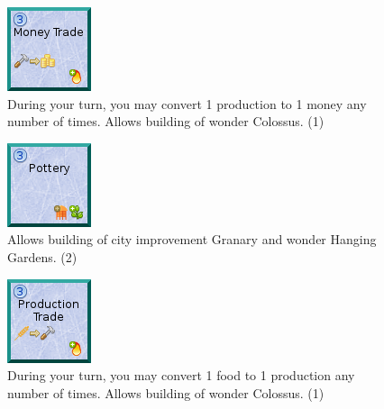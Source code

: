 \documentclass[11pt,a4paper,titlepage]{article}
\begin{document}
{{  \begin{figure}[!htb]
    \begin{minipage}[c]{0.1\textwidth}
      \includegraphics[scale=.7]{doe_tech_money_trade.png}
    \end{minipage}\hfill
    \begin{minipage}[c]{0.6\textwidth}
      \captionsetup{labelformat=empty, justification=justified, singlelinecheck=false}
      \caption{During your turn, you may convert 1 production to 1 money any number of times. Allows building of wonder Colossus. (1)}
    \end{minipage}\hfill
    \label{fig:tech_money_trade}
  \end{figure}

  \begin{figure}[!htb]
    \begin{minipage}[c]{0.1\textwidth}
      \includegraphics[scale=.7]{doe_tech_pottery.png}
    \end{minipage}\hfill
    \begin{minipage}[c]{0.6\textwidth}
      \captionsetup{labelformat=empty, justification=justified, singlelinecheck=false}
      \caption{Allows building of city improvement Granary and wonder Hanging Gardens. (2)}
    \end{minipage}\hfill
    \label{fig:tech_pottery}
  \end{figure}

  \begin{figure}[!htb]
    \begin{minipage}[c]{0.1\textwidth}
      \includegraphics[scale=.7]{doe_tech_production_trade.png}
    \end{minipage}\hfill
    \begin{minipage}[c]{0.6\textwidth}
      \captionsetup{labelformat=empty, justification=justified, singlelinecheck=false}
      \caption{During your turn, you may convert 1 food to 1 production any number of times. Allows building of wonder Colossus. (1)}
    \end{minipage}\hfill
    \label{fig:tech_production_trade}
  \end{figure}

}}
\end{document}
